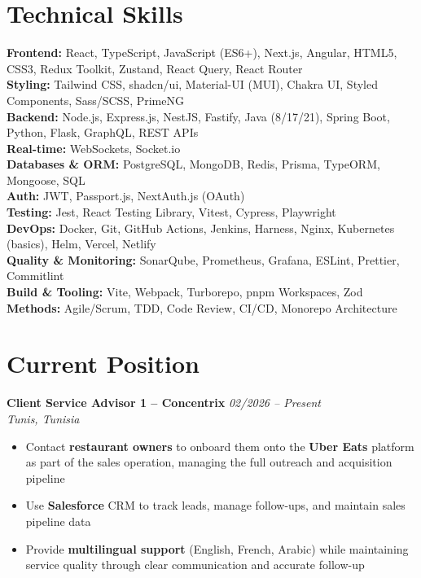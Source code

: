 \documentclass[10pt,a4paper]{article}
\begin{document}
\section*{Technical Skills}
{\small
\textbf{Frontend:} React, TypeScript, JavaScript (ES6+), Next.js, Angular, HTML5, CSS3, Redux Toolkit, Zustand, React Query, React Router\\[2pt]
\textbf{Styling:} Tailwind CSS, shadcn/ui, Material-UI (MUI), Chakra UI, Styled Components, Sass/SCSS, PrimeNG\\[2pt]
\textbf{Backend:} Node.js, Express.js, NestJS, Fastify, Java (8/17/21), Spring Boot, Python, Flask, GraphQL, REST APIs\\[2pt]
\textbf{Real-time:} WebSockets, Socket.io\\[2pt]
\textbf{Databases \& ORM:} PostgreSQL, MongoDB, Redis, Prisma, TypeORM, Mongoose, SQL\\[2pt]
\textbf{Auth:} JWT, Passport.js, NextAuth.js (OAuth)\\[2pt]
\textbf{Testing:} Jest, React Testing Library, Vitest, Cypress, Playwright\\[2pt]
\textbf{DevOps:} Docker, Git, GitHub Actions, Jenkins, Harness, Nginx, Kubernetes (basics), Helm, Vercel, Netlify\\[2pt]
\textbf{Quality \& Monitoring:} SonarQube, Prometheus, Grafana, ESLint, Prettier, Commitlint\\[2pt]
\textbf{Build \& Tooling:} Vite, Webpack, Turborepo, pnpm Workspaces, Zod\\[2pt]
\textbf{Methods:} Agile/Scrum, TDD, Code Review, CI/CD, Monorepo Architecture
}

\section*{Current Position}
{\small
\textbf{Client Service Advisor 1 -- Concentrix} \hfill \textit{02/2026 -- Present}\\[1pt]
\textit{Tunis, Tunisia}
\begin{itemize}
  \item Contact \textbf{restaurant owners} to onboard them onto the \textbf{Uber Eats} platform as part of the sales operation, managing the full outreach and acquisition pipeline
  \item Use \textbf{Salesforce} CRM to track leads, manage follow-ups, and maintain sales pipeline data
  \item Provide \textbf{multilingual support} (English, French, Arabic) while maintaining service quality through clear communication and accurate follow-up
\end{itemize}
}
\end{document}

